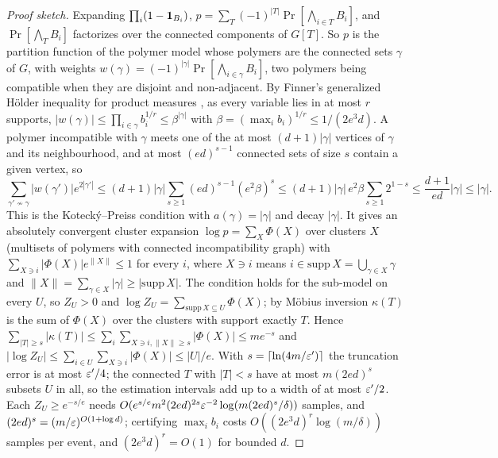 \begin{proof}[Proof sketch]
Expanding $\prod_i(1-\mathbf{1}_{B_i})$, $p=\sum_{T}(-1)^{|T|}\Pr[\bigwedge_{i\in T}B_i]$,
and $\Pr[\bigwedge_TB_i]$ factorizes over the connected components of $G[T]$. So $p$
is the partition function of the polymer model whose polymers are the connected
sets $\gamma$ of $G$, with weights $w(\gamma)=(-1)^{|\gamma|}\Pr[\bigwedge_{i\in\gamma}B_i]$,
two polymers being compatible when they are disjoint and non-adjacent. By Finner's
generalized Hölder inequality for product measures \cite{finner1992}, as every
variable lies in at most $r$ supports, $|w(\gamma)|\le\prod_{i\in\gamma}b_i^{1/r}\le\beta^{|\gamma|}$
with $\beta=(\max_ib_i)^{1/r}\le1/(2e^3d)$. A polymer incompatible with $\gamma$ meets one of
the at most $(d+1)|\gamma|$ vertices of $\gamma$ and its neighbourhood, and at most
$(ed)^{s-1}$ connected sets of size $s$ contain a given vertex, so
\[
\sum_{\gamma'\not\sim\gamma}|w(\gamma')|e^{2|\gamma'|}\le(d+1)|\gamma|\sum_{s\ge1}(ed)^{s-1}(e^2\beta)^s
\le(d+1)|\gamma|\,e^2\beta\sum_{s\ge1}2^{1-s}\le\frac{d+1}{ed}|\gamma|\le|\gamma|.
\]
This is the Kotecký--Preiss condition \cite{kp1986} with $a(\gamma)=|\gamma|$ and decay
$|\gamma|$. It gives an absolutely convergent cluster expansion
$\log p=\sum_X\Phi(X)$ over clusters $X$ (multisets of polymers with connected
incompatibility graph) with $\sum_{X\ni i}|\Phi(X)|e^{\|X\|}\le1$ for every $i$, where
$X\ni i$ means $i\in\mathrm{supp}\,X=\bigcup_{\gamma\in X}\gamma$ and $\|X\|=\sum_{\gamma\in X}|\gamma|\ge|\mathrm{supp}\,X|$. The
condition holds for the sub-model on every $U$, so $Z_U>0$ and
$\log Z_U=\sum_{\mathrm{supp}\,X\subseteq U}\Phi(X)$; by Möbius inversion $\kappa(T)$ is the
sum of $\Phi(X)$ over the clusters with support exactly $T$. Hence
$\sum_{|T|\ge s}|\kappa(T)|\le\sum_i\sum_{X\ni i,\|X\|\ge s}|\Phi(X)|\le me^{-s}$ and
$|\log Z_U|\le\sum_{i\in U}\sum_{X\ni i}|\Phi(X)|\le|U|/e$. With $s=\lceil\ln(4m/\varepsilon')\rceil$ the
truncation error is at most $\varepsilon'/4$; the connected $T$ with $|T|<s$ have at most
$m(2ed)^s$ subsets $U$ in all, so the estimation intervals add up to a width of at
most $\varepsilon'/2$.
Each $Z_U\ge e^{-s/e}$ needs $O(e^{s/e}m^2(2ed)^{2s}\varepsilon^{-2}\log(m(2ed)^s/\delta))$ samples, and
$(2ed)^s=(m/\varepsilon)^{O(1+\log d)}$; certifying $\max_ib_i$ costs
$O((2e^3d)^r\log(m/\delta))$ samples per event, and $(2e^3d)^r=O(1)$ for bounded $d$.
\end{proof}
